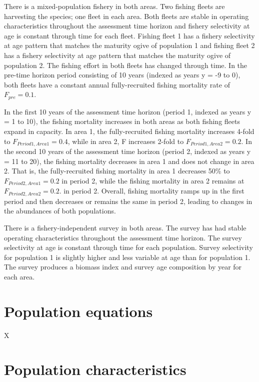 \documentclass[12pt]{article}
\begin{document}
There is a mixed-population fishery in both areas. Two fishing fleets are harvesting the species; one fleet in each area. Both fleets are stable in operating characteristics throughout the assessment time horizon and fishery selectivity at age is constant through time for each fleet. Fishing fleet 1 has a fishery selectivity at age pattern that matches the maturity ogive of population 1 and fishing fleet 2 has a fishery selectivity at age pattern that matches the maturity ogive of population 2. The fishing effort in both fleets has changed through time. In the pre-time horizon period consisting of 10 years (indexed as years y = -9 to 0), both fleets have a constant annual fully-recruited fishing mortality rate of $F_{pre} = 0.1$.

In the first 10 years of the assessment time horizon (period 1, indexed as years y = 1 to 10), the fishing mortality increases in both areas as both fishing fleets expand in capacity. In area 1, the fully-recruited fishing mortality increases 4-fold to $F_{Period 1, Area 1} = 0.4$, while in area 2, F increases 2-fold to $F_{Period 1, Area 2} = 0.2$. In the second 10 years of the assessment time horizon (period 2, indexed as years y = 11 to 20), the fishing mortality decreases in area 1 and does not change in area 2. That is, the fully-recruited fishing mortality in area 1 decreases 50\% to $F_{Period 2, Area 1} = 0.2$ in period 2, while the fishing mortality in area 2 remains at $F_{Period 2, Area 2} = 0.2$. in period 2. Overall, fishing mortality ramps up in the first period and then decreases or remains the same in period 2, leading to changes in the abundances of both populations.

There is a fishery-independent survey in both areas. The survey has had stable operating characteristics throughout the assessment time horizon. The survey selectivity at age is constant through time for each population. Survey selectivity for population 1 is slightly higher and less variable at age than for population 1. The survey produces a biomass index and survey age composition by year for each area.


\section{Population equations}

X


\section{Population characteristics}
\end{document}
